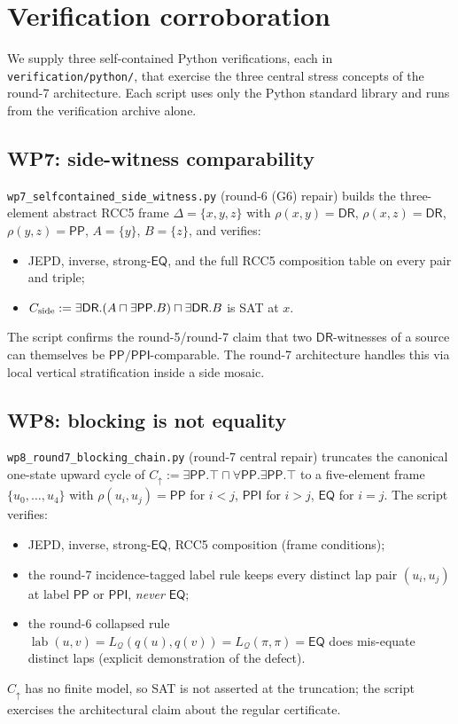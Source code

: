 \documentclass[11pt]{article}
\theoremstyle{definition}
\theoremstyle{remark}
\newcommand{\DR}{\mathsf{DR}}
\newcommand{\PP}{\mathsf{PP}}
\newcommand{\PPI}{\mathsf{PPI}}
\newcommand{\EQ}{\mathsf{EQ}}
\newcommand{\Q}{\mathcal Q}
\newcommand{\lab}{\operatorname{lab}}
\begin{document}
\section{Verification corroboration}
\label{sec:verification}

We supply three self-contained Python verifications, each in
\texttt{verification/python/}, that exercise the three central stress
concepts of the round-7 architecture.  Each script uses only the
Python standard library and runs from the verification archive alone.

\subsection{WP7: side-witness comparability}
\label{ssec:wp7}

\texttt{wp7\_selfcontained\_side\_witness.py} (round-6 (G6) repair)
builds the three-element abstract RCC5 frame $\Delta=\{x,y,z\}$ with
$\rho(x,y)=\DR$, $\rho(x,z)=\DR$, $\rho(y,z)=\PP$, $A=\{y\}$, $B=\{z\}$,
and verifies:
\begin{itemize}
\item JEPD, inverse, strong-$\EQ$, and the full RCC5 composition table
on every pair and triple;
\item $C_{\rm side}:=\exists\DR.(A\sqcap\exists\PP.B)\sqcap\exists\DR.B$
is SAT at $x$.
\end{itemize}
The script confirms the round-5/round-7 claim that two $\DR$-witnesses
of a source can themselves be $\PP/\PPI$-comparable.  The round-7
architecture handles this via local vertical stratification inside a
side mosaic.

\subsection{WP8: blocking is not equality}
\label{ssec:wp8}

\texttt{wp8\_round7\_blocking\_chain.py} (round-7 central repair)
truncates the canonical one-state upward cycle of
$C_\uparrow:=\exists\PP.\top\sqcap\forall\PP.\exists\PP.\top$ to a
five-element frame $\{u_0,\ldots,u_4\}$ with
$\rho(u_i,u_j)=\PP$ for $i<j$, $\PPI$ for $i>j$, $\EQ$ for $i=j$.
The script verifies:
\begin{itemize}
\item JEPD, inverse, strong-$\EQ$, RCC5 composition (frame
conditions);
\item the round-7 incidence-tagged label rule keeps every distinct
lap pair $(u_i,u_j)$ at label $\PP$ or $\PPI$, \emph{never} $\EQ$;
\item the round-6 collapsed rule
$\lab(u,v)=L_\Q(q(u),q(v))=L_\Q(\pi,\pi)=\EQ$ does mis-equate
distinct laps (explicit demonstration of the defect).
\end{itemize}
$C_\uparrow$ has no finite model, so SAT is not asserted at the truncation;
the script exercises the architectural claim about the regular
certificate.
\end{document}
